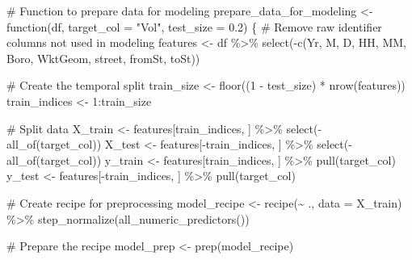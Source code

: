 \documentclass[
  letterpaper,
  DIV=11,
  numbers=noendperiod]{scrreprt}
\newenvironment{Shaded}{\begin{snugshade}}{\end{snugshade}}
\newcommand{\AttributeTok}[1]{\textcolor[rgb]{0.40,0.45,0.13}{#1}}
\newcommand{\CommentTok}[1]{\textcolor[rgb]{0.37,0.37,0.37}{#1}}
\newcommand{\ControlFlowTok}[1]{\textcolor[rgb]{0.00,0.23,0.31}{#1}}
\newcommand{\DecValTok}[1]{\textcolor[rgb]{0.68,0.00,0.00}{#1}}
\newcommand{\FloatTok}[1]{\textcolor[rgb]{0.68,0.00,0.00}{#1}}
\newcommand{\FunctionTok}[1]{\textcolor[rgb]{0.28,0.35,0.67}{#1}}
\newcommand{\NormalTok}[1]{\textcolor[rgb]{0.00,0.23,0.31}{#1}}
\newcommand{\OtherTok}[1]{\textcolor[rgb]{0.00,0.23,0.31}{#1}}
\newcommand{\SpecialCharTok}[1]{\textcolor[rgb]{0.37,0.37,0.37}{#1}}
\newcommand{\StringTok}[1]{\textcolor[rgb]{0.13,0.47,0.30}{#1}}
\begin{document}
\begin{Shaded}
\begin{Highlighting}[]
\CommentTok{\# Function to prepare data for modeling}
\NormalTok{prepare\_data\_for\_modeling }\OtherTok{\textless{}{-}} \ControlFlowTok{function}\NormalTok{(df, }\AttributeTok{target\_col =} \StringTok{"Vol"}\NormalTok{, }\AttributeTok{test\_size =} \FloatTok{0.2}\NormalTok{) \{}
  \CommentTok{\# Remove raw identifier columns not used in modeling}
\NormalTok{  features }\OtherTok{\textless{}{-}}\NormalTok{ df }\SpecialCharTok{\%\textgreater{}\%}
    \FunctionTok{select}\NormalTok{(}\SpecialCharTok{{-}}\FunctionTok{c}\NormalTok{(Yr, M, D, HH, MM, Boro, WktGeom, street, fromSt, toSt))}
  
  \CommentTok{\# Create the temporal split}
\NormalTok{  train\_size }\OtherTok{\textless{}{-}} \FunctionTok{floor}\NormalTok{((}\DecValTok{1} \SpecialCharTok{{-}}\NormalTok{ test\_size) }\SpecialCharTok{*} \FunctionTok{nrow}\NormalTok{(features))}
\NormalTok{  train\_indices }\OtherTok{\textless{}{-}} \DecValTok{1}\SpecialCharTok{:}\NormalTok{train\_size}
  
  \CommentTok{\# Split data}
\NormalTok{  X\_train }\OtherTok{\textless{}{-}}\NormalTok{ features[train\_indices, ] }\SpecialCharTok{\%\textgreater{}\%} \FunctionTok{select}\NormalTok{(}\SpecialCharTok{{-}}\FunctionTok{all\_of}\NormalTok{(target\_col))}
\NormalTok{  X\_test }\OtherTok{\textless{}{-}}\NormalTok{ features[}\SpecialCharTok{{-}}\NormalTok{train\_indices, ] }\SpecialCharTok{\%\textgreater{}\%} \FunctionTok{select}\NormalTok{(}\SpecialCharTok{{-}}\FunctionTok{all\_of}\NormalTok{(target\_col))}
\NormalTok{  y\_train }\OtherTok{\textless{}{-}}\NormalTok{ features[train\_indices, ] }\SpecialCharTok{\%\textgreater{}\%} \FunctionTok{pull}\NormalTok{(target\_col)}
\NormalTok{  y\_test }\OtherTok{\textless{}{-}}\NormalTok{ features[}\SpecialCharTok{{-}}\NormalTok{train\_indices, ] }\SpecialCharTok{\%\textgreater{}\%} \FunctionTok{pull}\NormalTok{(target\_col)}
  
  \CommentTok{\# Create recipe for preprocessing}
\NormalTok{  model\_recipe }\OtherTok{\textless{}{-}} \FunctionTok{recipe}\NormalTok{(}\SpecialCharTok{\textasciitilde{}}\NormalTok{ ., }\AttributeTok{data =}\NormalTok{ X\_train) }\SpecialCharTok{\%\textgreater{}\%}
    \FunctionTok{step\_normalize}\NormalTok{(}\FunctionTok{all\_numeric\_predictors}\NormalTok{())}
  
  \CommentTok{\# Prepare the recipe}
\NormalTok{  model\_prep }\OtherTok{\textless{}{-}} \FunctionTok{prep}\NormalTok{(model\_recipe)}
  

\end{Highlighting}
\end{Shaded}
\end{document}
